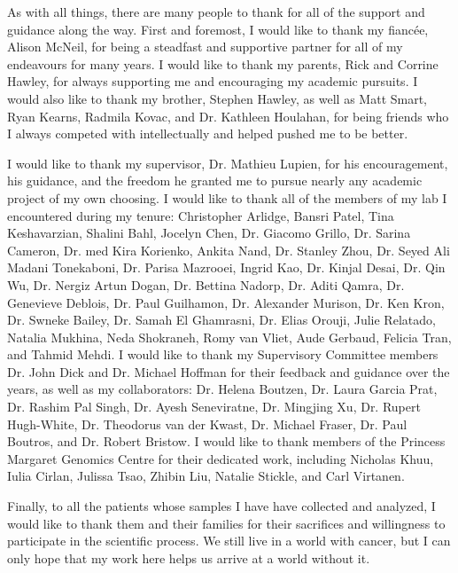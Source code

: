 \begin{acknowledgements}

  As with all things, there are many people to thank for all of the support and guidance along the way.
  First and foremost, I would like to thank my fianc\'ee, Alison McNeil, for being a steadfast and supportive partner for all of my endeavours for many years.
  I would like to thank my parents, Rick and Corrine Hawley, for always supporting me and encouraging my academic pursuits.
  I would also like to thank my brother, Stephen Hawley, as well as Matt Smart, Ryan Kearns, Radmila Kovac, and Dr. Kathleen Houlahan, for being friends who I always competed with intellectually and helped pushed me to be better.

  I would like to thank my supervisor, Dr. Mathieu Lupien, for his encouragement, his guidance, and the freedom he granted me to pursue nearly any academic project of my own choosing.
  I would like to thank all of the members of my lab I encountered during my tenure: Christopher Arlidge, Bansri Patel, Tina Keshavarzian, Shalini Bahl, Jocelyn Chen, Dr. Giacomo Grillo, Dr. Sarina Cameron, Dr. med Kira Korienko, Ankita Nand, Dr. Stanley Zhou, Dr. Seyed Ali Madani Tonekaboni, Dr. Parisa Mazrooei, Ingrid Kao, Dr. Kinjal Desai, Dr. Qin Wu, Dr. Nergiz Artun Dogan, Dr. Bettina Nadorp, Dr. Aditi Qamra, Dr. Genevieve Deblois, Dr. Paul Guilhamon, Dr. Alexander Murison, Dr. Ken Kron, Dr. Swneke Bailey, Dr. Samah El Ghamrasni, Dr. Elias Orouji, Julie Relatado, Natalia Mukhina, Neda Shokraneh, Romy van Vliet, Aude Gerbaud, Felicia Tran, and Tahmid Mehdi.
  I would like to thank my Supervisory Committee members Dr. John Dick and Dr. Michael Hoffman for their feedback and guidance over the years, as well as my collaborators: Dr. Helena Boutzen, Dr. Laura Garcia Prat, Dr. Rashim Pal Singh, Dr. Ayesh Seneviratne, Dr. Mingjing Xu, Dr. Rupert Hugh-White, Dr. Theodorus van der Kwast, Dr. Michael Fraser, Dr. Paul Boutros, and Dr. Robert Bristow.
  I would like to thank members of the Princess Margaret Genomics Centre for their dedicated work, including Nicholas Khuu, Iulia Cirlan, Julissa Tsao, Zhibin Liu, Natalie Stickle, and Carl Virtanen.

  Finally, to all the patients whose samples I have have collected and analyzed, I would like to thank them and their families for their sacrifices and willingness to participate in the scientific process.
  We still live in a world with cancer, but I can only hope that my work here helps us arrive at a world without it.
\end{acknowledgements}
